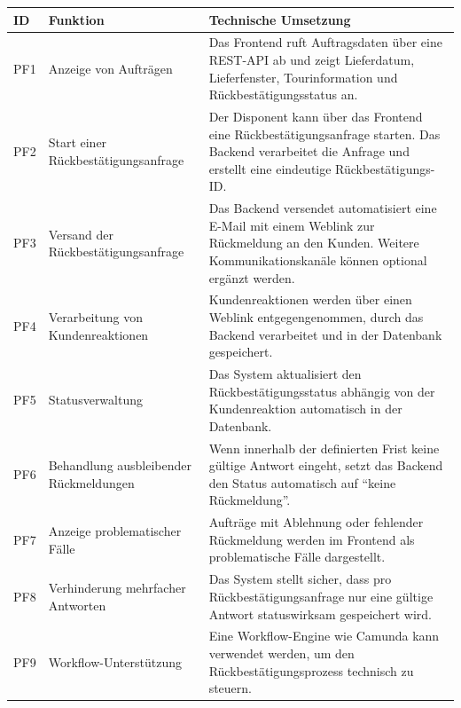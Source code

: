 \documentclass[12pt,a4paper]{article}
\begin{document}
\begin{longtable}{|p{1.5cm}|p{4cm}|p{8cm}|}
\hline
\textbf{ID} & \textbf{Funktion} & \textbf{Technische Umsetzung} \\
\hline

PF1 & Anzeige von Aufträgen &
Das Frontend ruft Auftragsdaten über eine REST-API ab und zeigt Lieferdatum, Lieferfenster, Tourinformation und Rückbestätigungsstatus an. \\
\hline

PF2 & Start einer Rückbestätigungsanfrage &
Der Disponent kann über das Frontend eine Rückbestätigungsanfrage starten. Das Backend verarbeitet die Anfrage und erstellt eine eindeutige Rückbestätigungs-ID. \\
\hline

PF3 & Versand der Rückbestätigungsanfrage &
Das Backend versendet automatisiert eine E-Mail mit einem Weblink zur Rückmeldung an den Kunden. Weitere Kommunikationskanäle können optional ergänzt werden. \\
\hline

PF4 & Verarbeitung von Kundenreaktionen &
Kundenreaktionen werden über einen Weblink entgegengenommen, durch das Backend verarbeitet und in der Datenbank gespeichert. \\
\hline

PF5 & Statusverwaltung &
Das System aktualisiert den Rückbestätigungsstatus abhängig von der Kundenreaktion automatisch in der Datenbank. \\
\hline

PF6 & Behandlung ausbleibender Rückmeldungen &
Wenn innerhalb der definierten Frist keine gültige Antwort eingeht, setzt das Backend den Status automatisch auf ``keine Rückmeldung''. \\
\hline

PF7 & Anzeige problematischer Fälle &
Aufträge mit Ablehnung oder fehlender Rückmeldung werden im Frontend als problematische Fälle dargestellt. \\
\hline

PF8 & Verhinderung mehrfacher Antworten &
Das System stellt sicher, dass pro Rückbestätigungsanfrage nur eine gültige Antwort statuswirksam gespeichert wird. \\
\hline

PF9 & Workflow-Unterstützung &
Eine Workflow-Engine wie Camunda kann verwendet werden, um den Rückbestätigungsprozess technisch zu steuern. \\
\hline

\end{longtable}
\end{document}
